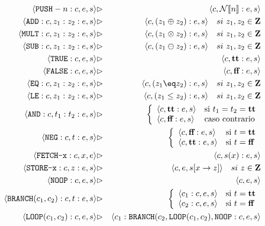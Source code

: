\begin{sist*}

\begin{eqnarray*}
    \conf{\n{PUSH}-n:c}{e}{s} &\rhd& \conf{c}{\fc{N}{n}:e}{s} \\
    \conf{\n{ADD}:c}{z_1:z_2:e}{s} &\rhd& \conf{c}{(z_1\oplus z_2):e}{s} \quad si \ z_1, z_2 \in \mathbf{Z} \\
    \conf{\n{MULT}:c}{z_1:z_2:e}{s} &\rhd& \conf{c}{(z_1\otimes z_2):e}{s} \quad si \ z_1, z_2 \in \mathbf{Z} \\
    \conf{\n{SUB}:c}{z_1:z_2:e}{s} &\rhd& \conf{c}{(z_1\ominus z_2):e}{s} \quad si \ z_1, z_2 \in \mathbf{Z} \\
    \conf{\n{TRUE}:c}{e}{s} &\rhd& \conf{c}{\textbf{tt}:e}{s} \\
    \conf{\n{FALSE}:c}{e}{s} &\rhd& \conf{c}{\textbf{ff}:e}{s} \\
    \conf{\n{EQ}:c}{z_1:z_2:e}{s} &\rhd& \conf{c}{(z_1 \eq z_2):e}{s} \quad si \ z_1, z_2 \in \mathbf{Z}\\
    \conf{\n{LE}:c}{z_1:z_2:e}{s} &\rhd& \conf{c}{(z_1 \leq z_2):e}{s}\quad si \ z_1, z_2 \in \mathbf{Z} \\
    \conf{\n{AND}:c}{t_1:t_2:e}{s} &\rhd& 
        \left\{\begin{array}{ll} 
            \conf{c}{\textbf{tt}:e}{s} & \text{si }t_1 = t_2 = \textbf{tt} \\
            \conf{c}{\textbf{ff}:e}{s} & \text{caso contrario}
        \end{array}\right. 
    \\
    \conf{\n{NEG}:c}{t:e}{s} &\rhd& 
        \left\{\begin{array}{ll} 
            \conf{c}{\textbf{ff}:e}{s} & \text{si }t = \textbf{tt} \\
            \conf{c}{\textbf{tt}:e}{s} & \text{si }t = \textbf{ff}
        \end{array}\right. \\
    \conf{\n{FETCH-x}:c}{x}{e} &\rhd&  \conf{c}{s(x):e}{s}
    \\
    \conf{\n{STORE-x}:c}{z:e}{s} &\rhd&  \conf{c}{e}{s[x\to z]} \quad si \ z \in \mathbf{Z}
    \\
    \conf{\n{NOOP}:c}{e}{s} &\rhd&  \conf{c}{e}{s} 
    \\
    \conf{\n{BRANCH}(c_1, c_2):c}{t:e}{s} &\rhd& 
        \left\{\begin{array}{ll} 
            \conf{c_1:c}{e}{s} & \text{si }t = \textbf{tt} \\
            \conf{c_2:c}{e}{s} & \text{si }t = \textbf{ff}
        \end{array}\right.
    \\
    \conf{\n{LOOP}(c_1,c_2):c}{e}{s} &\rhd&  \conf{c_1 : \n{BRANCH}(c_2, \n{LOOP}(c_1,c_2), \n{NOOP}:c}{e}{s} 
\end{eqnarray*}
\end{sist*}

